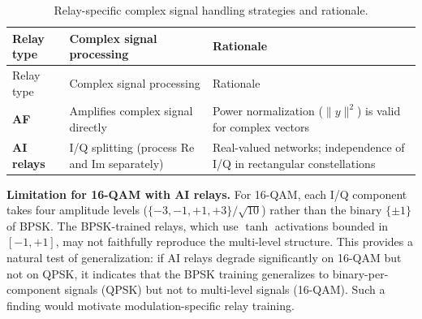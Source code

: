 \begin{longtable}[]{@{}
  >{\raggedright\arraybackslash}p{}
  >{\raggedright\arraybackslash}p{}
  >{\raggedright\arraybackslash}p{}@{}}
\caption{Relay-specific complex signal handling strategies and rationale.}\label{tbl:table31}\tabularnewline
\toprule\noalign{}
\begin{minipage}[b]{\linewidth}\raggedright
Relay type
\end{minipage} & \begin{minipage}[b]{\linewidth}\raggedright
Complex signal processing
\end{minipage} & \begin{minipage}[b]{\linewidth}\raggedright
Rationale
\end{minipage} \\
\midrule\noalign{}
\endfirsthead
\toprule\noalign{}
\begin{minipage}[b]{\linewidth}\raggedright
Relay type
\end{minipage} & \begin{minipage}[b]{\linewidth}\raggedright
Complex signal processing
\end{minipage} & \begin{minipage}[b]{\linewidth}\raggedright
Rationale
\end{minipage} \\
\midrule\noalign{}
\endhead
\bottomrule\noalign{}
\endlastfoot
\textbf{AF} & Amplifies complex signal directly & Power normalization (\(\|y\|^2\)) is valid for complex vectors \\
\textbf{AI relays} & I/Q splitting (process Re and Im separately) & Real-valued networks; independence of I/Q in rectangular constellations \\
\end{longtable}

\textbf{Limitation for 16-QAM with AI relays.} For 16-QAM, each I/Q component takes four amplitude levels (\(\{-3, -1, +1, +3\}/\sqrt{10}\)) rather than the binary \(\{\pm 1\}\) of BPSK. The BPSK-trained relays, which use \(\tanh\) activations bounded in \([-1, +1]\), may not faithfully reproduce the multi-level structure. This provides a natural test of generalization: if AI relays degrade significantly on 16-QAM but not on QPSK, it indicates that the BPSK training generalizes to binary-per-component signals (QPSK) but not to multi-level signals (16-QAM). Such a finding would motivate modulation-specific relay training.


